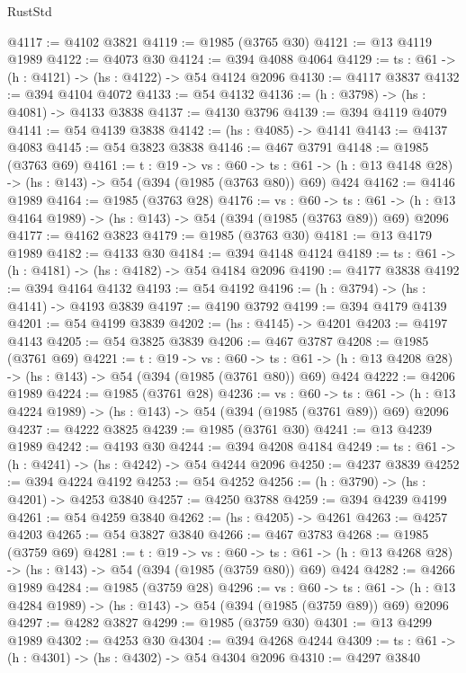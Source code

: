 \begin{lexlean}{RustStd}
\begin{coremodule}
{\begin{coremodule}
{{{{{{{{@4117 := @4102 @3821
@4119 := @1985 (@3765 @30)
@4121 := @13 @4119 @1989
@4122 := @4073 @30
@4124 := @394 @4088 @4064
@4129 := {ts : @61} -> (h : @4121) -> (hs : @4122) -> @54 @4124 @2096
@4130 := @4117 @3837
@4132 := @394 @4104 @4072
@4133 := @54 @4132
@4136 := (h : @3798) -> (hs : @4081) -> @4133 @3838
@4137 := @4130 @3796
@4139 := @394 @4119 @4079
@4141 := @54 @4139 @3838
@4142 := (hs : @4085) -> @4141
@4143 := @4137 @4083
@4145 := @54 @3823 @3838
@4146 := @467 @3791
@4148 := @1985 (@3763 @69)
@4161 := {t : @19} ->
  {vs : @60} ->
  {ts : @61} -> (h : @13 @4148 @28) -> (hs : @143) -> @54 (@394 (@1985 (@3763 @80)) @69) @424
@4162 := @4146 @1989
@4164 := @1985 (@3763 @28)
@4176 := {vs : @60} ->
  {ts : @61} -> (h : @13 @4164 @1989) -> (hs : @143) -> @54 (@394 (@1985 (@3763 @89)) @69) @2096
@4177 := @4162 @3823
@4179 := @1985 (@3763 @30)
@4181 := @13 @4179 @1989
@4182 := @4133 @30
@4184 := @394 @4148 @4124
@4189 := {ts : @61} -> (h : @4181) -> (hs : @4182) -> @54 @4184 @2096
@4190 := @4177 @3838
@4192 := @394 @4164 @4132
@4193 := @54 @4192
@4196 := (h : @3794) -> (hs : @4141) -> @4193 @3839
@4197 := @4190 @3792
@4199 := @394 @4179 @4139
@4201 := @54 @4199 @3839
@4202 := (hs : @4145) -> @4201
@4203 := @4197 @4143
@4205 := @54 @3825 @3839
@4206 := @467 @3787
@4208 := @1985 (@3761 @69)
@4221 := {t : @19} ->
  {vs : @60} ->
  {ts : @61} -> (h : @13 @4208 @28) -> (hs : @143) -> @54 (@394 (@1985 (@3761 @80)) @69) @424
@4222 := @4206 @1989
@4224 := @1985 (@3761 @28)
@4236 := {vs : @60} ->
  {ts : @61} -> (h : @13 @4224 @1989) -> (hs : @143) -> @54 (@394 (@1985 (@3761 @89)) @69) @2096
@4237 := @4222 @3825
@4239 := @1985 (@3761 @30)
@4241 := @13 @4239 @1989
@4242 := @4193 @30
@4244 := @394 @4208 @4184
@4249 := {ts : @61} -> (h : @4241) -> (hs : @4242) -> @54 @4244 @2096
@4250 := @4237 @3839
@4252 := @394 @4224 @4192
@4253 := @54 @4252
@4256 := (h : @3790) -> (hs : @4201) -> @4253 @3840
@4257 := @4250 @3788
@4259 := @394 @4239 @4199
@4261 := @54 @4259 @3840
@4262 := (hs : @4205) -> @4261
@4263 := @4257 @4203
@4265 := @54 @3827 @3840
@4266 := @467 @3783
@4268 := @1985 (@3759 @69)
@4281 := {t : @19} ->
  {vs : @60} ->
  {ts : @61} -> (h : @13 @4268 @28) -> (hs : @143) -> @54 (@394 (@1985 (@3759 @80)) @69) @424
@4282 := @4266 @1989
@4284 := @1985 (@3759 @28)
@4296 := {vs : @60} ->
  {ts : @61} -> (h : @13 @4284 @1989) -> (hs : @143) -> @54 (@394 (@1985 (@3759 @89)) @69) @2096
@4297 := @4282 @3827
@4299 := @1985 (@3759 @30)
@4301 := @13 @4299 @1989
@4302 := @4253 @30
@4304 := @394 @4268 @4244
@4309 := {ts : @61} -> (h : @4301) -> (hs : @4302) -> @54 @4304 @2096
@4310 := @4297 @3840
}}}}}}}}
\end{coremodule}}
\end{coremodule}
\end{lexlean}
